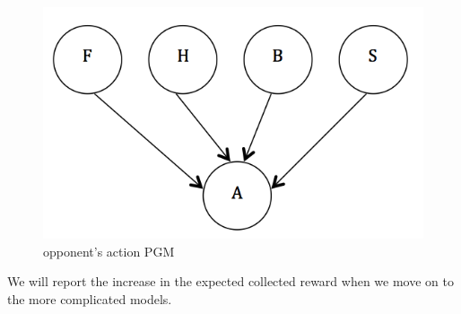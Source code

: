 \begin{figure}[h!]
  	\centering
 	\includegraphics[scale = .4]{fig1}
	\caption{opponent's action PGM}
\end{figure}

We will report the increase in the expected collected reward when we move on to the more 
complicated models.